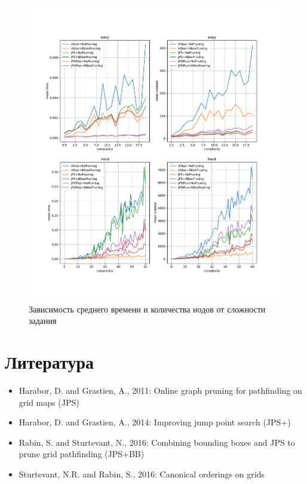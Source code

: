 \documentclass{physlab}
\begin{document}
\begin{figure}[H]
	\includegraphics[width=0.93\linewidth]{comparison.pdf}
\caption{Зависимость среднего времени и количества нодов от сложности задания}
\end{figure} 



\section{Литература}
\begin{itemize}
    \item Harabor, D. and Grastien, A., 2011: Online graph pruning for pathfinding on grid maps (JPS)
    \item Harabor, D. and Grastien, A., 2014: Improving jump point search (JPS+)
    \item Rabin, S. and Sturtevant, N., 2016: Combining bounding boxes and JPS to prune grid pathfinding (JPS+BB)
    \item Sturtevant, N.R. and Rabin, S., 2016: Canonical orderings on grids
\end{itemize}
    
\end{document}
